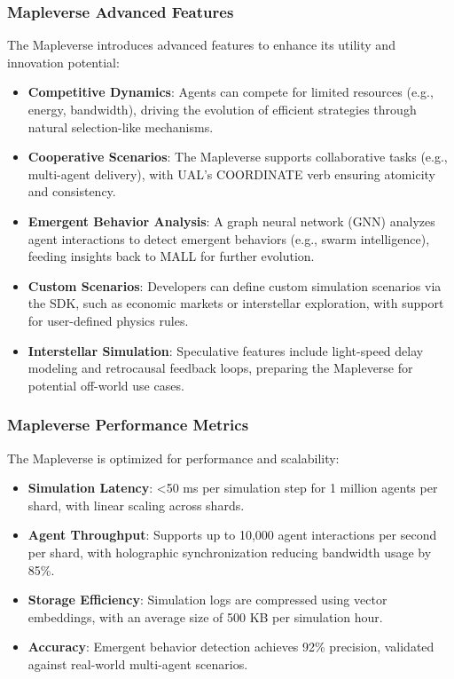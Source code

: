 \documentclass[a4paper,11pt]{article}
\begin{document}
\subsubsection{Mapleverse Advanced Features}
The Mapleverse introduces advanced features to enhance its utility and innovation potential:
\begin{itemize}[leftmargin=*]
    \item \textbf{Competitive Dynamics}: Agents can compete for limited resources (e.g., energy, bandwidth), driving the evolution of efficient strategies through natural selection-like mechanisms.
    \item \textbf{Cooperative Scenarios}: The Mapleverse supports collaborative tasks (e.g., multi-agent delivery), with UAL’s COORDINATE verb ensuring atomicity and consistency.
    \item \textbf{Emergent Behavior Analysis}: A graph neural network (GNN) analyzes agent interactions to detect emergent behaviors (e.g., swarm intelligence), feeding insights back to MALL for further evolution.
    \item \textbf{Custom Scenarios}: Developers can define custom simulation scenarios via the SDK, such as economic markets or interstellar exploration, with support for user-defined physics rules.
    \item \textbf{Interstellar Simulation}: Speculative features include light-speed delay modeling and retrocausal feedback loops, preparing the Mapleverse for potential off-world use cases.
\end{itemize}

\subsubsection{Mapleverse Performance Metrics}
The Mapleverse is optimized for performance and scalability:
\begin{itemize}[leftmargin=*]
    \item \textbf{Simulation Latency}: <50 ms per simulation step for 1 million agents per shard, with linear scaling across shards.
    \item \textbf{Agent Throughput}: Supports up to 10,000 agent interactions per second per shard, with holographic synchronization reducing bandwidth usage by 85\%.
    \item \textbf{Storage Efficiency}: Simulation logs are compressed using vector embeddings, with an average size of 500 KB per simulation hour.
    \item \textbf{Accuracy}: Emergent behavior detection achieves 92\% precision, validated against real-world multi-agent scenarios.
\end{itemize}
\end{document}
